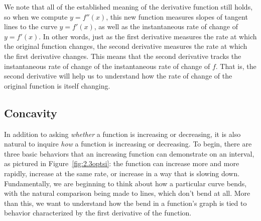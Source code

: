 We note that all of the established meaning of the derivative function still holds, so when we compute $y = f''(x)$, this new function measures slopes of tangent lines to the curve $y = f'(x)$, as well as the instantaneous rate of change of $y = f'(x)$.  In other words, just as the first derivative measures the rate at which the original function changes, the second derivative measures the rate at which the first derivative changes.  This means that the second derivative tracks the instantaneous rate of change of the instantaneous rate of change of $f$.  That is, the second derivative will help us to understand how the rate of change of the original function is itself changing.

\subsection*{Concavity}

In addition to asking \emph{whether} a function is increasing or decreasing, it is also natural to inquire \emph{how} a function is increasing or decreasing.  To begin, there are three basic behaviors that an increasing function can demonstrate on an interval, as pictured in Figure~\ref{fig:2.3optsi}:  the function can increase more and more rapidly, increase at the same rate, or increase in a way that is slowing down.  Fundamentally, we are beginning to think about how a particular curve bends, with the natural comparison being made to lines, which don't bend at all.  More than this, we want to understand how the bend in a function's graph is tied to behavior characterized by the first derivative of the function.

